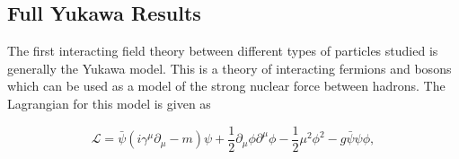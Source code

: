 \subsection{Full Yukawa Results}
\label{sec:yukawa_results}

The first interacting field theory between different types of particles studied is generally the Yukawa model.
This is a theory of interacting fermions and bosons which can be used as a model of the strong nuclear force between hadrons.
The Lagrangian for this model is given as

\begin{equation}
    \label{eq:yukawa-lagrangian}
    \mathcal{L} = \bar \psi \left(i\gamma^\mu \partial_\mu - m \right)\psi + \frac{1}{2}\partial_\mu \phi \partial^\mu \phi - \frac{1}{2}\mu^2\phi^2 - g\bar \psi \psi \phi,
\end{equation}

